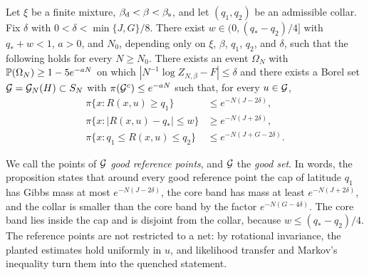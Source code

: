 \begin{proposition}\label{prop:pr-good}
Let $\xi$ be a finite mixture, $\beta_{\mathrm d}<\beta<\beta_{\mathrm s}$, and let $(q_1,q_2)$ be an admissible collar. Fix $\delta$ with $0<\delta<\min\{J,G\}/8$. There exist $w\in(0,(q_*-q_2)/4]$ with $q_*+w<1$, $a>0$, and $N_0$, depending only on $\xi$, $\beta$, $q_1$, $q_2$, and $\delta$, such that the following holds for every $N\ge N_0$. There exists an event $\Omega_N$ with $\mathbb P(\Omega_N)\ge1-5e^{-aN}$ on which $|N^{-1}\log Z_{N,\beta}-F|\le\delta$ and there exists a Borel set $\mathcal G=\mathcal G_N(H)\subset S_N$ with $\pi(\mathcal G^c)\le e^{-aN}$ such that, for every $u\in\mathcal G$,
\begin{align}
\pi\{x\colon R(x,u)\ge q_1\}&\le e^{-N(J-2\delta)},\label{eq:pr-good-cap}\\
\pi\{x\colon|R(x,u)-q_*|\le w\}&\ge e^{-N(J+2\delta)},\label{eq:pr-good-core}\\
\pi\{x\colon q_1\le R(x,u)\le q_2\}&\le e^{-N(J+G-2\delta)}.\label{eq:pr-good-collar}
\end{align}
\end{proposition}

We call the points of $\mathcal G$ \emph{good reference points}, and $\mathcal G$ the \emph{good set}. In words, the proposition states that around every good reference point the cap of latitude $q_1$ has Gibbs mass at most $e^{-N(J-2\delta)}$, the core band has mass at least $e^{-N(J+2\delta)}$, and the collar is smaller than the core band by the factor $e^{-N(G-4\delta)}$. The core band lies inside the cap and is disjoint from the collar, because $w\le(q_*-q_2)/4$. The reference points are not restricted to a net: by rotational invariance, the planted estimates hold uniformly in $u$, and likelihood transfer and Markov's inequality turn them into the quenched statement.

